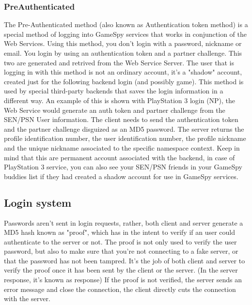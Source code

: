 \documentclass[oneside,titlepage,a4paper]{Definition/retrospy} %
\begin{document}
		\subsubsection{PreAuthenticated}
			The Pre-Authenticated method (also known as Authentication token method) is a special method of logging into GameSpy services that works in conjunction of the Web Services.
			Using this method, you don't login with a password, nickname or email. You login by using an authentication token and a partner challenge. This two are generated and retrived from the Web Service Server.
			The user that is logging in with this method is not an ordinary account, it's a "shadow" account, created just for the following backend login (and possibly game).
			This method is used by special third-party backends that saves the login information in a different way. An example of this is shown with PlayStation 3 login (NP), the Web Service would generate an auth token and partner challenge from the SEN/PSN User information.
			The client needs to send the authentication token and the partner challenge disguized as an MD5 password.
			The server returns the profile identification number, the user identification number, the profile nickname and the unique nickname associated to the specific namespace context.
			Keep in mind that this are permanent account associated with the backend, in case of PlayStation 3 service, you can also see your SEN/PSN friends in your GameSpy buddies list if they had created a shadow account for use in GameSpy services. 


		\subsection{Login system}
			Passwords aren't sent in login requests, rather, both client and server generate a MD5 hash known as "proof", which has in the intent to verify if an user could authenticate to the server or not.
			The proof is not only used to verify the user password, but also to make sure that you're not connecting to a fake server, or that the password has not been tampred.
			It's the job of both client and server to verify the proof once it has been sent by the client or the server. (In the server response, it's known as response)
			If the proof is not verified, the server sends an error message and close the connection, the client directly cuts the connection with the server.
\end{document}
